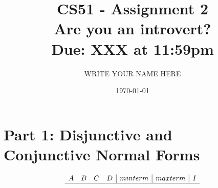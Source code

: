 \documentclass[11pt]{article}
\title{CS51 - Assignment 2\\Are you an introvert?\\{\normalsize Due: XXX at 11:59pm}}
\author{WRITE YOUR NAME HERE}
\date{\today}
\begin{document}
\maketitle

\section{Part 1: Disjunctive and Conjunctive Normal Forms}


\begin{displaymath}
\begin{array}{cccc|c|c|c}
A & B & C & D  & minterm & maxterm & I\\
\hline


\end{array}
\end{displaymath}
\end{document}
